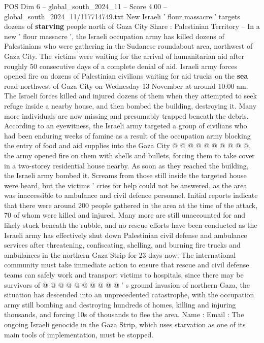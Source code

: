 \begin{textsample}{POS Dim 6 – global\_south\_2024\_11 – Score 4.00 – global\_south\_2024\_11/117714749.txt}  \label{ex:f6_pos_390}
New Israeli ' flour massacre ' targets dozens of \textbf{starving} people north of Gaza City Share : Palestinian Territory -- In a new ' flour massacre ', the Israeli occupation army has killed dozens of Palestinians who were gathering in the Sudanese roundabout area, northwest of Gaza City.
The victims were waiting for the arrival of humanitarian aid after roughly 50 consecutive days of a complete denial of aid.
Israeli army forces opened fire on dozens of Palestinian civilians waiting for aid trucks on the \textbf{sea} road northwest of Gaza City on Wednesday 13 November at around 10:00 am.
The Israeli forces killed and injured dozens of them when they attempted to seek refuge inside a nearby house, and then bombed the building, destroying it.
Many more individuals are now missing and presumably trapped beneath the debris.
According to an eyewitness, the Israeli army targeted a group of civilians who had been enduring weeks of famine as a result of the occupation army blocking the entry of food and aid supplies into the Gaza City @ @ @ @ @ @ @ @ @ @, the army opened fire on them with shells and bullets, forcing them to take cover in a two-storey residential house nearby.
As soon as they reached the building, the Israeli army bombed it.
Screams from those still inside the targeted house were heard, but the victims ' cries for help could not be answered, as the area was inaccessible to ambulance and civil defence personnel.
Initial reports indicate that there were around 200 people gathered in the area at the time of the attack, 70 of whom were killed and injured.
Many more are still unaccounted for and likely stuck beneath the rubble, and no rescue efforts have been conducted as the Israeli army has effectively shut down Palestinian civil defense and ambulance services after threatening, confiscating, shelling, and burning fire trucks and ambulances in the northern Gaza Strip for 23 days now.
The international community must take immediate action to ensure that rescue and civil defense teams can safely work and transport victims to hospitals, since there may be survivors of @ @ @ @ @ @ @ @ @ @ ' s ground invasion of northern Gaza, the situation has descended into an unprecedented catastrophe, with the occupation army still bombing and destroying hundreds of homes, killing and injuring thousands, and forcing 10s of thousands to flee the area.
Name : Email : The ongoing Israeli genocide in the Gaza Strip, which uses starvation as one of its main tools of implementation, must be stopped.

\end{textsample}
